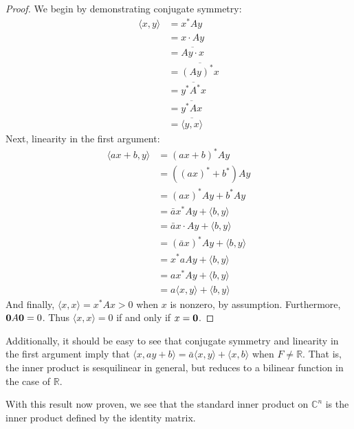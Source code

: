 \documentclass{article}
\begin{document}
\begin{proof}
We begin by demonstrating conjugate symmetry:
\begin{align}
	\langle x, y \rangle &= x^*Ay \\
	&= x \cdot Ay \\
	&= \overline{Ay \cdot x} \\
	&= \overline{(Ay)^*x} \\
	&= \overline{y^*A^*x} \\
	&= \overline{y^*Ax} \\
	&= \overline{\langle y, x \rangle}
\end{align}
Next, linearity in the first argument:
\begin{align}
	\langle ax+b, y \rangle &= (ax+b)^*Ay \\
	&= ((ax)^*+b^*)Ay \\ 
	&= (ax)^*Ay +b^*Ay \\ 
	&= \bar{a}x^*Ay + \langle b, y \rangle \\
	&= \bar{a}x \cdot Ay + \langle b, y \rangle \\
	&= (\bar{a}x)^*Ay + \langle b, y \rangle \\
	&= x^*aAy + \langle b, y \rangle \\
	&= ax^*Ay + \langle b, y \rangle \\
	&= a \langle x, y \rangle + \langle b, y \rangle 
\end{align}
And finally,
$\langle x, x \rangle =x^*Ax>0$ when $x$ is nonzero, by assumption. Furthermore, $\bold{0}A \bold{0}=0$. Thus 
$\langle x, x \rangle =0$ if and only if $x=\bold{0}$.
\end{proof}
Additionally, it should be easy to see that conjugate symmetry and linearity in the first argument imply that 
$\langle x, ay+b \rangle=\bar{a} \langle x, y \rangle + \langle x, b \rangle$ when $F \neq \mathbb{R}$. That is, the inner product is sesquilinear in general, but reduces to a bilinear function in the case of $\mathbb{R}$.

With this result now proven, we see that the standard inner product on $\mathbb{C}^n$ is the inner product defined by the identity matrix.
\end{document}

